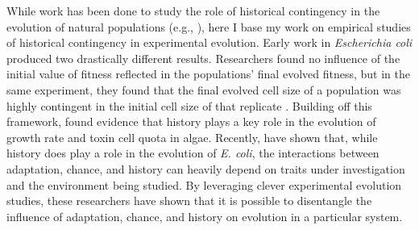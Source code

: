 While work has been done to study the role of historical contingency in the evolution of natural populations (e.g., \citep{lososContingencyDeterminismReplicated1998, kellerHistoryChanceAdaptation2008a}), here I base my work on empirical studies of historical contingency in experimental evolution.
Early work in \textit{Escherichia coli} produced two drastically different results. 
Researchers found no influence of the initial value of fitness reflected in the populations' final evolved fitness, but in the same experiment, they found that the final evolved cell size of a population was highly contingent in the initial cell size of that replicate \citep{travisanoExperimentalTestsRoles1995}.%
Building off this framework, \citet{flores-moyaEffectsAdaptationChance2012} found evidence that history plays a key role in the evolution of growth rate and toxin cell quota in algae. 
Recently, \citet{smithFitnessEvolvingBacterial2022} have shown that, while history does play a role in the evolution of \textit{E. coli}, the interactions between adaptation, chance, and history can heavily depend on traits under investigation and the environment being studied. 
By leveraging clever experimental evolution studies, these researchers have shown that it is possible to disentangle the influence of adaptation, chance, and history on evolution in a particular system. 


